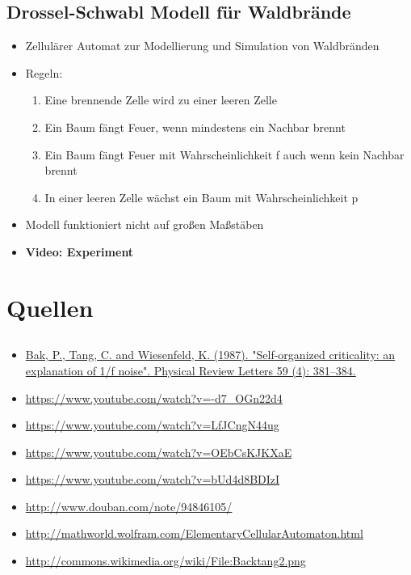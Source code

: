 \documentclass{beamer}
\begin{document}
\subsection{Drossel-Schwabl Modell für Waldbrände}
\begin{frame}{\insertsection}{\insertsubsection}
	\begin{itemize}
        \item Zellulärer Automat zur Modellierung und Simulation von Waldbränden
        \item Regeln:
        \begin{enumerate}
            \item Eine brennende Zelle wird zu einer leeren Zelle
            \item Ein Baum fängt Feuer, wenn mindestens ein Nachbar brennt
            \item Ein Baum fängt Feuer mit Wahrscheinlichkeit f auch wenn kein Nachbar brennt
            \item In einer leeren Zelle wächst ein Baum mit Wahrscheinlichkeit p
        \end{enumerate}
        \item Modell funktioniert nicht auf großen Maßstäben
        \item \textbf{Video: Experiment}
	\end{itemize}
\end{frame}

\section{Quellen}
\subsection{}
\begin{frame}{\insertsection}{\insertsubsection}
	\begin{itemize}
        \tiny
        \item \url{Bak, P., Tang, C. and Wiesenfeld, K. (1987). "Self-organized criticality: an
            explanation of 1/f noise". Physical Review Letters 59 (4): 381–384.}
        \item \url{https://www.youtube.com/watch?v=-d7\_OGn22d4}
        \item \url{https://www.youtube.com/watch?v=LfJCngN44ug}
        \item \url{https://www.youtube.com/watch?v=OEbCsKJKXaE}
        \item \url{https://www.youtube.com/watch?v=bUd4d8BDIzI}
        \item \url{http://www.douban.com/note/94846105/}
        \item \url{http://mathworld.wolfram.com/ElementaryCellularAutomaton.html}
        \item \url{http://commons.wikimedia.org/wiki/File:Backtang2.png}
	\end{itemize}
\end{frame}
\end{document}
